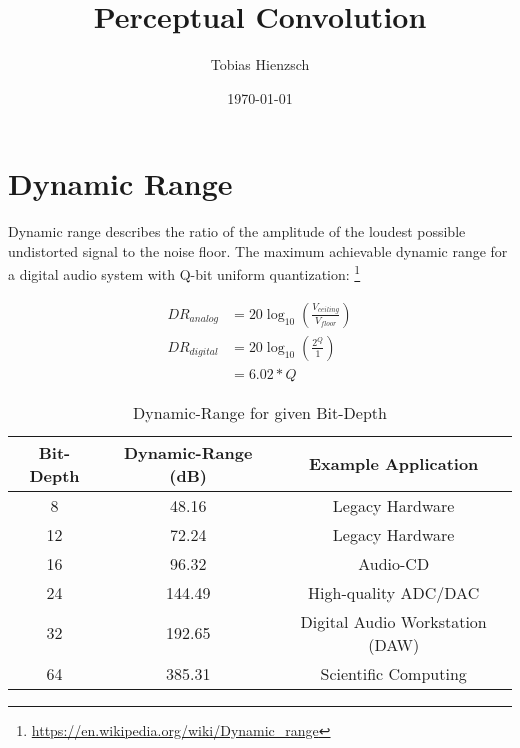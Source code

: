 \documentclass{report}
\title{Perceptual Convolution}
\author{Tobias Hienzsch}
\date{\today}
\begin{document}
\maketitle
\newpage

\tableofcontents
\newpage

\thispagestyle{empty}
\listoffigures
\listoftables
\newpage


\chapter{Dynamic Range}

Dynamic range describes the ratio of the amplitude of the loudest possible
undistorted signal to the noise floor. The maximum achievable dynamic range for
a digital audio system with Q-bit uniform quantization:
\footnote{\url{https://en.wikipedia.org/wiki/Dynamic_range}}

\begin{equation}
    \begin{split}
        DR_{analog}  & = 20\log_{10} \left(\frac{V_{ceiling}}{V_{floor}}\right) \\
        DR_{digital} & = 20\log_{10} \left(\frac{2^Q}{1}\right) \\
                     & = 6.02 * Q
    \end{split}
\end{equation}

\begin{center}

\end{center}

\begin{table}[h!]
    \centering
    \begin{tabular}{||c c c||}
        \hline
        Bit-Depth & Dynamic-Range (dB) & Example Application \\
        \hline
        \hline
        8 & 48.16 & Legacy Hardware \\
        \hline
        12 & 72.24 & Legacy Hardware \\
        \hline
        16 & 96.32 & Audio-CD \\
        \hline
        24 & 144.49 & High-quality ADC/DAC \\
        \hline
        32 & 192.65 & Digital Audio Workstation (DAW) \\
        \hline
        64 & 385.31 & Scientific Computing \\
        \hline
    \end{tabular}
    \caption{Dynamic-Range for given Bit-Depth}
    \label{table:1}
\end{table}
\end{document}
